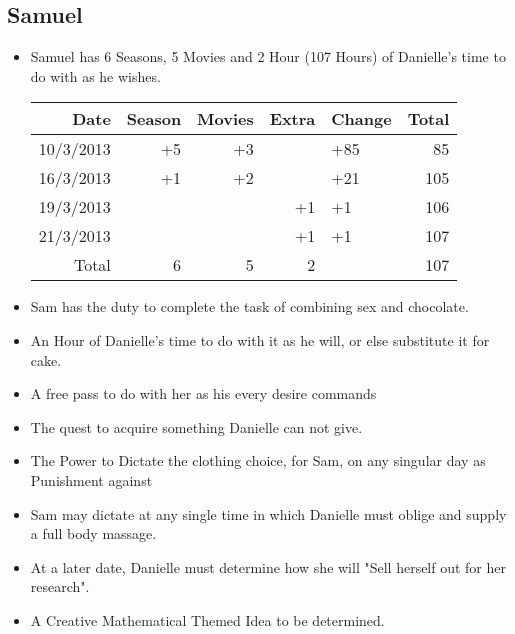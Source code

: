    \subsection{Samuel}
   \begin{itemize}
     \item Samuel has 6 Seasons, 5 Movies and 2 Hour (107 Hours) of Danielle's time to do with as he wishes.\\
     \begin{tabular}{r|rrr|l||r}
 		Date&Season&Movies&Extra&Change&Total\\
 		\hline
 		10/3/2013&+5&+3	&	&+85	&85 \\
 		16/3/2013&+1&+2	&	&+21	&105\\
 		19/3/2013&	&	&+1	&+1		&106\\
 		21/3/2013&	&	&+1	&+1		&107\\
 		\hline
 		\hline
 		Total&6&5&2&&107
 	\end{tabular}
     \item Sam has the duty to complete the task of combining sex and chocolate.
     \item An Hour of Danielle's time to do with it as he will, or else substitute it for cake.
     \item A free pass to do with her as his every desire commands
     \item The quest to acquire something Danielle can not give.
     \item The Power to Dictate the clothing choice, for Sam, on any singular day as Punishment against
     \item Sam may dictate at any single time in which Danielle must oblige and supply a full body massage.
     \item At a later date, Danielle must determine how she will "Sell herself out for her research".
     \item A Creative Mathematical Themed Idea to be determined.
   \end{itemize}
    